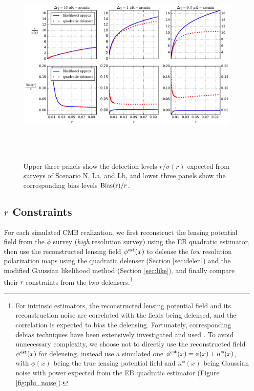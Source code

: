 \documentclass[iop,apj, numberedappendix]{emulateapj}
\begin{document}
\begin{figure}
\centering
\includegraphics[height=4in]{f3.pdf}
\caption{\label{fig:f3}
Upper three panels show the detection levels $r/\sigma(r)$ expected from surveys of Scenario N, La, and Lb,
and lower three panels show the corresponding bias levels ${\rm Bias(r)}/r$.}
\end{figure}



\subsection{$r$ Constraints}
For each simulated CMB realization, we first reconstruct the lensing potential field from
the $\phi$ survey (\emph{high} resolution survey)
using the EB quadratic estimator,
then use the reconstructed lensing field $\phi^{\rm est}(x)$ to delense the
\emph{low} resolution polarization maps using the quadratic delenser (Section \ref{sec:delen})
and the modified Gaussian likelihood method (Section \ref{sec:like}),
and finally compare their $r$ constraints from the two delensers.\footnote{For intrinsic estimators,
the reconstructed lensing potential field and its reconstruction noise are
correlated with the fields being delensed, and the correlation is expected to bias
the delensing. Fortunately, corresponding debias techniques have been extensively investigated
and used \citep[see e.g.][]{Teng2011,Namikawa2015,Sehgal2016,Carron2017}.
To avoid unnecessary complexity, we choose not to directly use the reconstructed field
$\phi^{\rm est}(x)$ for delensing,
instead use a simulated one $\phi^{\rm est}(x) = \phi(x) + n^\phi(x)$,
with $\phi(x)$ being the true lensing potential field and $n^\phi(x)$ being Gaussian noise
with power expected from the EB quadratic estimator (Figure \ref{fig:phi_noise}).}
\end{document}
